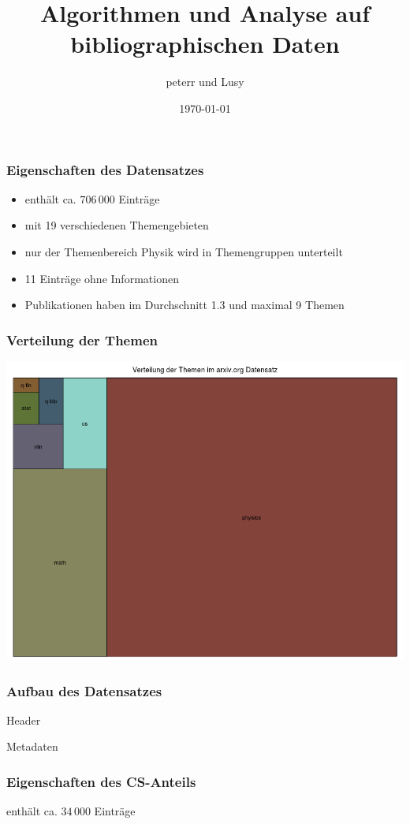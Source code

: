 \documentclass[12pt, xcolor=table]{beamer}
\begin{document}
\title{Algorithmen und Analyse auf bibliographischen Daten}
\author{peterr und Lusy}
\date{\today}

\begin{frame}
	\titlepage
\end{frame}

\begin{frame}
	\frametitle{Eigenschaften des Datensatzes}
	\begin{itemize}
		\item  enthält ca. $706\,000$ Einträge
		\item  mit 19 verschiedenen Themengebieten
		\item  nur der Themenbereich Physik wird in Themengruppen unterteilt
		\item  11 Einträge ohne Informationen
		\item  Publikationen haben im Durchschnitt 1.3 und maximal 9 Themen
	\end{itemize}
\end{frame}

\begin{frame}
	\frametitle{Verteilung der Themen}
	\begin{center}
		\includegraphics[scale=0.35]{../../visual/treeParent2.png}
	\end{center}
\end{frame}
\begin{frame}[fragile]
	\frametitle{Aufbau des Datensatzes}
	\begin{block}{Header}
		
	\end{block}
	\begin{block}{Metadaten}
		
	\end{block}
\end{frame}
\begin{frame} [fragile]
	\frametitle{Eigenschaften des CS-Anteils}
	 {\small
     enthält ca. $34\,000$ Einträge\\
    }
     
\end{frame}
\end{document}
